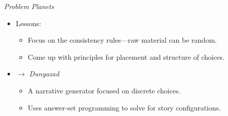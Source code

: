 \documentclass[xcolor=x11names]{beamer}
\def\dunyazad/{\textit{Dunyazad}}
\def\problemplanets/{\textit{Problem Planets}}
\begin{document}
\begin{frame}{\problemplanets/}
  \begin{itemize}\addtolength{\itemsep}{0.5\baselineskip}
    \item Lessons:
    \begin{itemize}\addtolength{\itemsep}{0.5\baselineskip}
      \vspace{0.5\baselineskip}
      \item Focus on the consistency rules---raw material can be random.
      \item Come up with principles for placement and structure of choices.
    \end{itemize}
    \item $\rightarrow$ \dunyazad/
    \begin{itemize}\addtolength{\itemsep}{0.5\baselineskip}
      \vspace{0.5\baselineskip}
      \item A narrative generator focused on discrete choices.
      \item Uses answer-set programming to solve for story configurations.
    \end{itemize}
  \end{itemize}
\end{frame}
\end{document}

